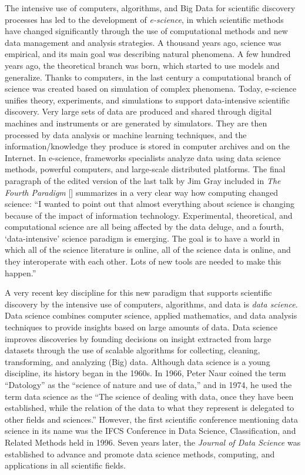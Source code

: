 The intensive use of computers, algorithms, and Big Data for scientific discovery processes has led to the development of \textit{e-science}, in which scientific methods have changed significantly through the use of computational methods and new data management and analysis strategies. A thousand years ago, science was empirical, and its main goal was describing natural phenomena. A few hundred years ago, the theoretical branch was born, which started to use models and generalize. Thanks to computers, in the last century a computational branch of science was created based on simulation of complex phenomena. Today, e-science unifies theory, experiments, and simulations to support data-intensive scientific discovery. Very large sets of data are produced and shared through digital machines and instruments or are generated by simulators. They are then processed by data analysis or machine learning techniques, and the information/{\allowbreak}knowledge they produce is stored in computer archives and on the Internet. In e-science, frameworks specialists analyze data using data science methods, powerful computers, and large-scale distributed platforms. The final paragraph of the edited version of the last talk by Jim Gray included in \textit{The Fourth Paradigm} [\citealt{chap:3:Heyetal:2009}] summarizes in a very clear way how computing changed science: ``I wanted to point out that almost everything about science is changing because of the impact of information technology. Experimental, theoretical, and computational science are all being affected by the data deluge, and a fourth, `data-intensive' science paradigm is emerging. The goal is to have a world in which all of the science literature is online, all of the science data is online, and they interoperate with each other. Lots of new tools are needed to make this happen.''

A very recent key discipline for this new paradigm that supports scientific discovery by the intensive use of computers, algorithms, and data is \textit{data science}. Data science combines computer science, applied mathematics, and data analysis techniques to provide insights based on large amounts of data. Data science improves discoveries by founding decisions on insight extracted from large datasets through the use of scalable algorithms for collecting, cleaning, transforming, and analyzing (Big) data. Although data science is a young discipline, its history began in the 1960s. In 1966, Peter Naur coined the term ``Datology'' as the ``science of nature and use of data,'' and in 1974, he used the term data science as the ``The science of dealing with data, once they have been established, while the relation of the data to what they represent is delegated to other fields and sciences.'' However, the first scientific conference mentioning data science in its name was the IFCS Conference in Data Science, Classification, and Related Methods held in 1996. Seven years later, the \textit{Journal of Data Science} was established to advance and promote data science methods, computing, and applications in all scientific fields.

